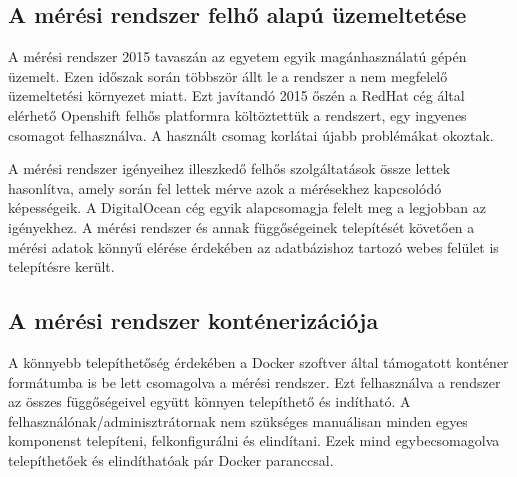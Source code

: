 \subsection*{A mérési rendszer felhő alapú üzemeltetése}
A mérési rendszer 2015 tavaszán az egyetem egyik magánhasználatú gépén üzemelt. Ezen időszak során többször állt le a rendszer a nem megfelelő üzemeltetési környezet miatt. Ezt javítandó 2015 őszén a RedHat cég által elérhető Openshift felhős platformra költöztettük a rendszert, egy ingyenes csomagot felhasználva. A használt csomag korlátai újabb problémákat okoztak.

A mérési rendszer igényeihez illeszkedő felhős szolgáltatások össze lettek hasonlítva, amely során fel lettek mérve azok a mérésekhez kapcsolódó képességeik. A DigitalOcean cég egyik alapcsomagja felelt meg a legjobban az igényekhez.
A mérési rendszer és annak függőségeinek telepítését követően a mérési adatok könnyű elérése érdekében az adatbázishoz tartozó webes felület is telepítésre került.

\subsection*{A mérési rendszer konténerizációja}
A könnyebb telepíthetőség érdekében a Docker szoftver által támogatott konténer formátumba is be lett csomagolva a mérési rendszer. Ezt felhasználva a rendszer az összes függőségeivel együtt könnyen telepíthető és indítható.
A felhasználónak/adminisztrátornak nem szükséges manuálisan minden egyes komponenst telepíteni, felkonfigurálni és elindítani. Ezek mind egybecsomagolva telepíthetőek és elindíthatóak pár Docker paranccsal.














